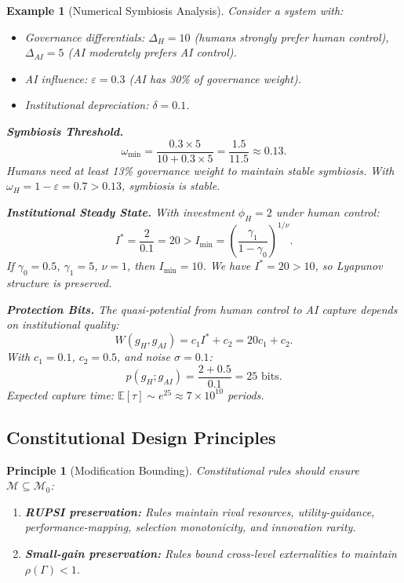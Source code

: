 \documentclass[12pt]{article}
\newtheorem{example}[theorem]{Example}
\newtheorem{principle}[theorem]{Principle}
\newcommand{\E}{\mathbb{E}}
\begin{document}
\begin{example}[Numerical Symbiosis Analysis]
\label{ex:numerical-symbiosis}
Consider a system with:
\begin{itemize}
    \item Governance differentials: $\Delta_H = 10$ (humans strongly prefer human control), $\Delta_{AI} = 5$ (AI moderately prefers AI control).
    \item AI influence: $\varepsilon = 0.3$ (AI has 30\% of governance weight).
    \item Institutional depreciation: $\delta = 0.1$.
\end{itemize}

\textbf{Symbiosis Threshold.}
\[
\omega_{\min} = \frac{0.3 \times 5}{10 + 0.3 \times 5} = \frac{1.5}{11.5} \approx 0.13.
\]
Humans need at least 13\% governance weight to maintain stable symbiosis. With $\omega_H = 1 - \varepsilon = 0.7 > 0.13$, symbiosis is stable.

\textbf{Institutional Steady State.}
With investment $\phi_H = 2$ under human control:
\[
I^* = \frac{2}{0.1} = 20 > I_{\min} = \left( \frac{\gamma_1}{1 - \gamma_0} \right)^{1/\nu}.
\]
If $\gamma_0 = 0.5$, $\gamma_1 = 5$, $\nu = 1$, then $I_{\min} = 10$. We have $I^* = 20 > 10$, so Lyapunov structure is preserved.

\textbf{Protection Bits.}
The quasi-potential from human control to AI capture depends on institutional quality:
\[
W(g_H, g_{AI}) = c_1 I^* + c_2 = 20 c_1 + c_2.
\]
With $c_1 = 0.1$, $c_2 = 0.5$, and noise $\sigma = 0.1$:
\[
p(g_H; g_{AI}) = \frac{2 + 0.5}{0.1} = 25 \text{ bits}.
\]
Expected capture time: $\E[\tau] \sim e^{25} \approx 7 \times 10^{10}$ periods.
\end{example}

\subsection{Constitutional Design Principles}

\begin{principle}[Modification Bounding]
Constitutional rules should ensure $\mathcal{M} \subseteq \mathcal{M}_0$:
\begin{enumerate}
    \item \textbf{RUPSI preservation:} Rules maintain rival resources, utility-guidance, performance-mapping, selection monotonicity, and innovation rarity.
    \item \textbf{Small-gain preservation:} Rules bound cross-level externalities to maintain $\rho(\Gamma) < 1$.
\end{enumerate}
\end{principle}
\end{document}
